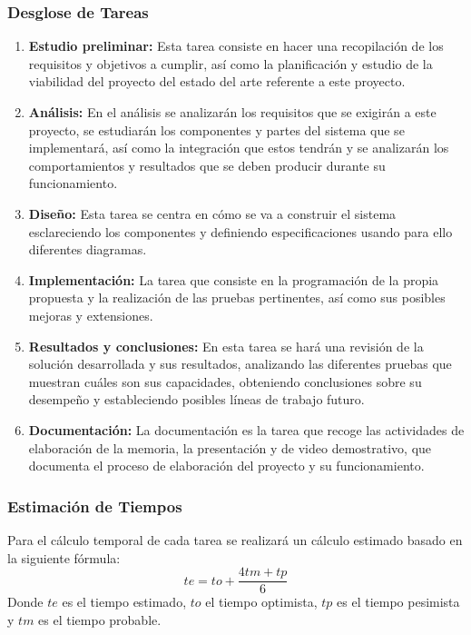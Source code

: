         \subsubsection{Desglose de Tareas}
        \begin{enumerate}
            \item \textbf{Estudio preliminar:} Esta tarea consiste en hacer una recopilación de los requisitos y objetivos a cumplir, así como la planificación y estudio de la viabilidad del proyecto del estado del arte referente a este proyecto.
            \item \textbf{Análisis:} En el análisis se analizarán los requisitos que se exigirán a este proyecto, se estudiarán los componentes y partes del sistema que se implementará, así como la integración que estos tendrán y se analizarán los comportamientos y resultados que se deben producir durante su funcionamiento.
            \item \textbf{Diseño:} Esta tarea se centra en cómo se va a construir el sistema esclareciendo los componentes y definiendo especificaciones usando para ello diferentes diagramas.
            \item \textbf{Implementación:} La tarea que consiste en la programación de la propia propuesta y la realización de las pruebas pertinentes, así como sus posibles mejoras y extensiones.
            \item \textbf{Resultados y conclusiones:} En esta tarea se hará una revisión de la solución desarrollada y sus resultados, analizando las diferentes pruebas que muestran cuáles son sus capacidades, obteniendo conclusiones sobre su desempeño y estableciendo posibles líneas de trabajo futuro.
            \item \textbf{Documentación:} La documentación es la tarea que recoge las actividades de elaboración de la memoria, la presentación y de video demostrativo, que documenta el proceso de elaboración del proyecto y su funcionamiento.
        \end{enumerate}
        
        \subsubsection{Estimación de Tiempos}
        Para el cálculo temporal de cada tarea se realizará un cálculo estimado basado en la siguiente fórmula:
        \begin{equation}
            te = to + \frac{4tm + tp}{6} \label{eq:temporal}
        \end{equation}
        Donde $te$ es el tiempo estimado, $to$ el tiempo optimista, $tp$ es el tiempo pesimista y $tm$ es el tiempo probable.

